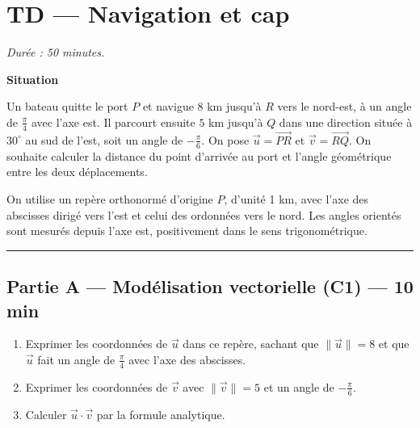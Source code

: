 

\section*{TD — Navigation et cap}

\textit{Durée : 50 minutes.}

\bigskip

\begin{center}
\textbf{Situation}

\medskip
\parbox{0.9\textwidth}{Un bateau quitte le port $P$ et navigue $8$ km jusqu'à $R$ vers le nord-est, à un angle de $\frac{\pi}{4}$ avec l'axe est. Il parcourt ensuite $5$ km jusqu'à $Q$ dans une direction située à $30^\circ$ au sud de l'est, soit un angle de $-\frac{\pi}{6}$. On pose $\vec u=\overrightarrow{PR}$ et $\vec v=\overrightarrow{RQ}$. On souhaite calculer la distance du point d'arrivée au port et l'angle géométrique entre les deux déplacements.}
\end{center}

On utilise un repère orthonormé d'origine $P$, d'unité 1 km, avec l'axe des abscisses dirigé vers l'est et celui des ordonnées vers le nord.
Les angles orientés sont mesurés depuis l'axe est, positivement dans le sens trigonométrique.

\bigskip

\hrule

\bigskip

\subsection*{Partie A — Modélisation vectorielle (C1) — 10 min}

\begin{enumerate}
  \item Exprimer les coordonnées de $\vec{u}$ dans ce repère, sachant que $\|\vec{u}\| = 8$ et que $\vec{u}$ fait un angle de $\frac{\pi}{4}$ avec l'axe des abscisses.
  \item Exprimer les coordonnées de $\vec{v}$ avec $\|\vec{v}\| = 5$ et un angle de $-\frac{\pi}{6}$.
  \item Calculer $\vec{u} \cdot \vec{v}$ par la formule analytique.
\end{enumerate}

